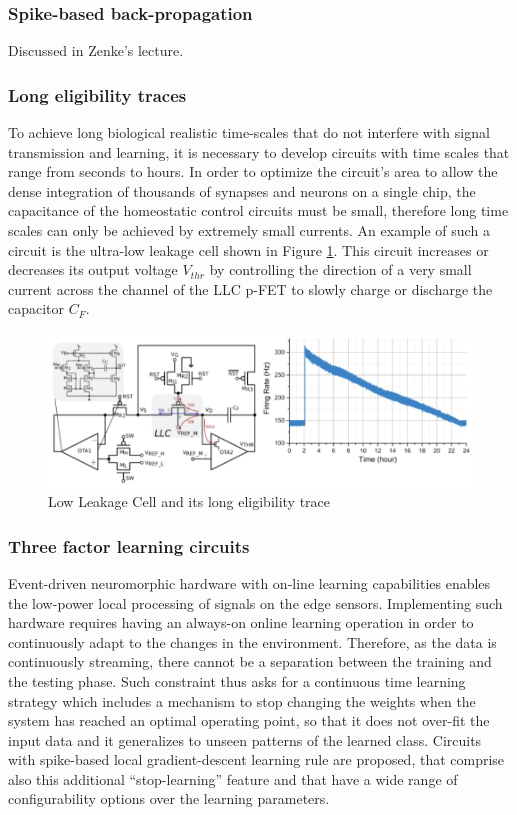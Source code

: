 \documentclass[main]{subfiles}
\begin{document}
\subsubsection*{Spike-based back-propagation}
Discussed in Zenke's lecture.

\subsubsection*{Long eligibility traces}
To achieve long biological realistic time-scales that do not interfere with signal transmission and learning, it is necessary to develop circuits with time scales that range from seconds to hours. In order to optimize the circuit’s area to allow the dense integration of thousands of synapses and neurons on a single chip, the capacitance of the homeostatic control circuits must be small, therefore long time scales can only be achieved by extremely small currents. An example of such a circuit is the ultra-low leakage cell shown in Figure \ref{fig:cell}. This circuit increases or decreases its output voltage $V_{thr}$ by controlling the direction of a very small current across the channel of the LLC p-FET to slowly charge or discharge the capacitor $C_F$. 

%
\begin{figure}[h]
    \centering
    \includegraphics[width=0.8\linewidth]{12_NeuromorphicSystems2/figures/cell.PNG}
    \caption{Low Leakage Cell and its long eligibility trace}
    \label{fig:cell}
\end{figure}
%

\subsubsection*{Three factor learning circuits}

Event-driven neuromorphic hardware with on-line learning capabilities enables the low-power local processing of signals on the edge sensors. Implementing such hardware requires having an always-on online learning operation in order to continuously adapt to the changes in the environment. Therefore, as the data is continuously streaming, there cannot be a separation between the training and the testing phase. Such constraint thus asks for a continuous time learning strategy which includes a mechanism to stop changing the weights when the system has reached an optimal operating point, so that it does not over-fit the input data and it generalizes to unseen patterns of the learned class. Circuits with spike-based local gradient-descent learning rule are proposed, that comprise also this additional “stop-learning” feature and that have a wide range of configurability options over the learning parameters. 
\end{document}
